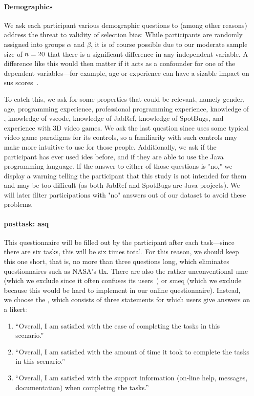 \documentclass[../thesis]{subfiles}
\begin{document}
\paragraph{Demographics}
We ask each participant various demographic questions to (among other reasons) address the threat to validity of selection bias:
While participants are randomly assigned into groups $\alpha$ and $\beta$, it is of course possible due to our moderate sample size of $n = 20$ that there is a significant difference in any independent variable.
A difference like this would then matter if it acts as a confounder for one of the dependent variables---for example, age or experience can have a sizable impact on \gls{sus} scores~\cites[585]{bangor2008}{mclellan2012}.

To catch this, we ask for some properties that could be relevant, namely
gender, age, programming experience, professional programming experience, knowledge of \SEE{}, knowledge of \gls{vscode}, knowledge of JabRef, knowledge of SpotBugs, and experience with 3D video games.
We ask the last question since \SEE{} uses some typical video game paradigms for its controls, so a familiarity with such controls may make \SEE{} more intuitive to use for those people.
Additionally, we ask if the participant has ever used \glspl{ide} before, and if they are able to use the Java programming language.
If the answer to either of those questions is "no," we display a warning telling the participant that this study is not intended for them and may be too difficult (as both JabRef and SpotBugs are Java projects).
We will later filter participations with "no" answers out of our dataset to avoid these problems.

\paragraph{\Gls{posttask}: \gls{asq}}
This questionnaire will be filled out by the participant after each task---since there are six tasks, this will be six times total.
For this reason, we should keep this one short, that is, no more than three questions long, which eliminates questionnaires such as NASA's \gls{tlx}.
There are also the rather unconventional \gls{ume} (which we exclude since it often confuses its users~\cite[1607--1608]{sauro2009b}) or \gls{smeq} (which we exclude because this would be hard to implement in our online questionnaire).
Instead, we choose the \emph{}, which consists of three statements for which users give answers on a \gls{likert}:
\begin{enumerate}
	\item \enquote{Overall, I am satisfied with the ease of completing the tasks in this scenario.}
	\item \enquote{Overall, I am satisfied with the amount of time it took to complete the tasks in this scenario.}
	\item \enquote{Overall, I am satisfied with the support information (on-line help, messages, documentation) when completing the tasks.}
\end{enumerate}
\end{document}
